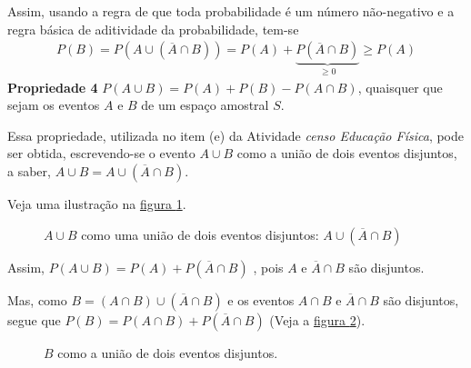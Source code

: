 Assim, usando a regra de que toda probabilidade é um número não-negativo e a regra básica de aditividade da probabilidade, tem-se
\begin{equation*}
\begin{split}P(B)=P(A\cup(\overline{A}\cap B))=P(A)+\underbrace{P(\overline{A}\cap B)}_{\geq 0}\geq P(A)\end{split}
\end{equation*}
\textbf{Propriedade 4} \(P(A\cup B)=P(A)+P(B)-P(A\cap B)\), quaisquer que sejam os eventos \(A\) e \(B\) de um espaço amostral \(S\).

Essa propriedade, utilizada no item (e) da Atividade \emph{censo Educação Física}, pode ser obtida, escrevendo-se o evento \(A\cup B\) como a união de dois eventos disjuntos, a saber, \(A\cup B=A\cup (\overline{A}\cap B)\).

Veja uma ilustração na \hyperref[eventosdijuntos2]{figura \ref{eventosdijuntos2}}.
\begin{figure}[H]
\centering


\caption{\(A\cup B\) como uma união de dois eventos disjuntos: \(A\cup (\overline{A}\cap B)\)}
\label{eventosdijuntos2}
\end{figure}

Assim, \(P(A\cup B)=P(A)+P(\overline{A}\cap B)\) , pois \(A\) e \(\overline{A}\cap B\) são disjuntos.

Mas, como \(B=(A\cap B) \cup (\overline{A}\cap B)\) e os eventos \(A\cap B\) e \(\overline{A}\cap B\) são disjuntos, segue que \(P(B)=P(A\cap B)+P(\overline{A}\cap B)\) (Veja a \hyperref[eventosdijuntos3]{figura \ref{eventosdijuntos3}}).

\begin{figure}[H]
\centering

\caption{\(B\) como a união de dois eventos disjuntos.}
\label{eventosdijuntos3}
\end{figure}

